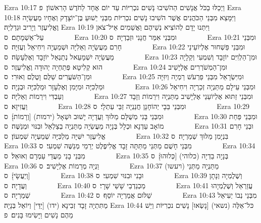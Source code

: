 Ezra 10:17	וַיְכַלּוּ בַכֹּל אֲנָשִׁים הַהֹשִׁיבוּ נָשִׁים נכְרִיּוֹת עַד יוֹם אֶחָד לַחֹדֶשׁ הָרִאשׁוֹן׃ {פ}
Ezra 10:18	וַיִּמָּצֵא מִבְּנֵי הַכֹּהֲנִים אֲשֶׁר הֹשִׁיבוּ נָשִׁים נכְרִיּוֹת מִבְּנֵי יֵשׁוּעַ בֶּן־יוֹצָדָק וְאֶחָיו מַעֲשֵׂיָה וֶאֱלִיעֶזֶר וְיָרִיב וּגְדַלְיָה׃
Ezra 10:19	וַיִּתְּנוּ יָדָם לְהוֹצִיא נְשֵׁיהֶם וַאֲשֵׁמִים אֵיל־צֹאן עַל־אַשְׁמָתָם׃ {ס}        
Ezra 10:20	וּמִבְּנֵי אִמֵּר חֲנָנִי וּזְבַדְיָה׃ {ס}        
Ezra 10:21	וּמִבְּנֵי חָרִם מַעֲשֵׂיָה וְאֵלִיָּה וּשְׁמַעְיָה וִיחִיאֵל וְעֻזִּיָּה׃ {ס}        
Ezra 10:22	וּמִבְּנֵי פַּשְׁחוּר אֶלְיוֹעֵינַי מַעֲשֵׂיָה יִשְׁמָעֵאל נְתַנְאֵל יוֹזָבָד וְאֶלְעָשָׂה׃ {ס}        
Ezra 10:23	וּמִן־הַלְוִיִּם יוֹזָבָד וְשִׁמְעִי וְקֵלָיָה הוּא קְלִיטָא פְּתַחְיָה יְהוּדָה וֶאֱלִיעֶזֶר׃ {ס}        
Ezra 10:24	וּמִן־הַמְשֹׁרְרִים אֶלְיָשִׁיב וּמִן־הַשֹּׁעֲרִים שַׁלֻּם וָטֶלֶם וְאוּרִי׃ {ס}        
Ezra 10:25	וּמִיִּשְׂרָאֵל מִבְּנֵי פַרְעֹשׁ רַמְיָה וְיִזִּיָּה וּמַלְכִּיָּה וּמִיָּמִן וְאֶלְעָזָר וּמַלְכִּיָּה וּבְנָיָה׃ {ס}        
Ezra 10:26	וּמִבְּנֵי עֵילָם מַתַּנְיָה זְכַרְיָה וִיחִיאֵל וְעַבְדִּי וִירֵמוֹת וְאֵלִיָּה׃ {ס}        
Ezra 10:27	וּמִבְּנֵי זַתּוּא אֶלְיוֹעֵנַי אֶלְיָשִׁיב מַתַּנְיָה וִירֵמוֹת וְזָבָד וַעֲזִיזָא׃ {ס}        
Ezra 10:28	וּמִבְּנֵי בֵּבָי יְהוֹחָנָן חֲנַנְיָה זַבַּי עַתְלָי׃ {ס}        
Ezra 10:29	וּמִבְּנֵי בָּנִי מְשֻׁלָּם מַלּוּךְ וַעֲדָיָה יָשׁוּב וּשְׁאָל (ירמות) [וְרָמוֹת]׃ {ס}        
Ezra 10:30	וּמִבְּנֵי פַּחַת מוֹאָב עַדְנָא וּכְלָל בְּנָיָה מַעֲשֵׂיָה מַתַּנְיָה בְצַלְאֵל וּבִנּוּי וּמְנַשֶּׁה׃ {ס}        
Ezra 10:31	וּבְנֵי חָרִם אֱלִיעֶזֶר יִשִּׁיָּה מַלְכִּיָּה שְׁמַעְיָה שִׁמְעוֹן׃ {ס}        
Ezra 10:32	בִּנְיָמִן מַלּוּךְ שְׁמַרְיָה׃ {ס}        
Ezra 10:33	מִבְּנֵי חָשֻׁם מַתְּנַי מַתַּתָּה זָבָד אֱלִיפֶלֶט יְרֵמַי מְנַשֶּׁה שִׁמְעִי׃ {ס}        
Ezra 10:34	מִבְּנֵי בָנִי מַעֲדַי עַמְרָם וְאוּאֵל׃ {ס}        
Ezra 10:35	בְּנָיָה בֵדְיָה (כלוהי) [כְּלוּהוּ]׃ {ס}        
Ezra 10:36	וַנְיָה מְרֵמוֹת אֶלְיָשִׁיב׃ {ס}        
Ezra 10:37	מַתַּנְיָה מַתְּנַי (ויעשו) [וְיַעֲשָׂי]׃ {ס}        
Ezra 10:38	וּבָנִי וּבִנּוּי שִׁמְעִי׃ {ס}        
Ezra 10:39	וְשֶׁלֶמְיָה וְנָתָן וַעֲדָיָה׃ {ס}        
Ezra 10:40	מַכְנַדְבַי שָׁשַׁי שָׁרָי׃ {ס}        
Ezra 10:41	עֲזַרְאֵל וְשֶׁלֶמְיָהוּ שְׁמַרְיָה׃ {ס}        
Ezra 10:42	שַׁלּוּם אֲמַרְיָה יוֹסֵף׃ {ס}        
Ezra 10:43	מִבְּנֵי נְבוֹ יְעִיאֵל מַתִּתְיָה זָבָד זְבִינָא (ידו) [יַדַּי] וְיוֹאֵל בְּנָיָה׃
Ezra 10:44	כּל־אֵלֶּה (נשאי) [נָשְׂאוּ] נָשִׁים נכְרִיּוֹת וְיֵשׁ מֵהֶם נָשִׁים וַיָּשִׂימוּ בָּנִים׃ {פ}
